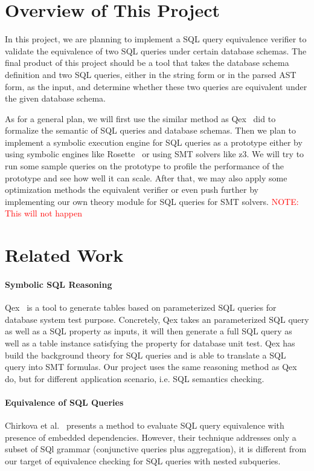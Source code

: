 \documentclass{article}
\newcommand\note[1]{\textcolor{red}{NOTE: #1}}
\begin{document}
\section{Overview of This Project}
In this project, we are planning to implement a SQL query equivalence verifier
to validate the equivalence of two SQL queries under certain database schemas.
The final product of this project should be a tool that takes the database schema
definition and two SQL queries, either in the string form or in the parsed AST form, 
as the input, and determine whether these two queries are equivalent under the given
database schema.

As for a general plan, we will first use the similar method as Qex~\cite{veanes2010qex,veanes2009symbolic} did
to formalize the semantic of SQL queries and database schemas.
Then we plan to implement a symbolic execution engine for SQL queries as a prototype 
either by using symbolic engines like Rosette~\cite{torlak2014lightweight} 
or using SMT solvers like z3.
We will try to run some sample queries on the prototype to profile the performance of the
prototype and see how well it can scale.
After that, we may also apply some optimization methods the equivalent verifier 
or even push further by implementing our own theory module for SQL queries for SMT solvers.
\note{This will not happen}



\section{Related Work}

\paragraph{Symbolic SQL Reasoning} Qex~\cite{veanes2010qex,veanes2009symbolic} is a tool to generate tables based on parameterized SQL queries for database system test purpose. Concretely, Qex takes an parameterized SQL query as well as a SQL property as inputs, it will then generate a full SQL query as well as a table instance satisfying the property for database unit test. Qex has build the background theory for SQL queries and is able to translate a SQL query into SMT formulas. Our project uses the same reasoning method as Qex do, but for different application scenario, i.e. SQL semantics checking.

\paragraph{Equivalence of SQL Queries} Chirkova et al.~\cite{chirkova2009equivalence} presents a method to evaluate SQL query equivalence with presence of embedded dependencies. However, their technique addresses only a subset of SQl grammar (conjunctive queries plus aggregation), it is different from our target of equivalence checking for SQL queries with nested subqueries. 
\end{document}
